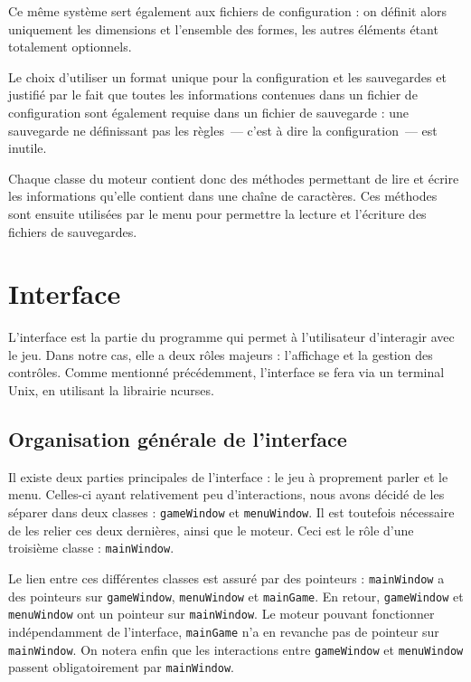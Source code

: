 \documentclass[11pt,a4paper]{article}
\begin{document}
Ce même système sert également aux fichiers de configuration : on définit alors uniquement les dimensions et l'ensemble des formes, les autres éléments étant totalement optionnels.

Le choix d'utiliser un format unique pour la configuration et les sauvegardes et justifié par le fait que toutes les informations contenues dans un fichier de configuration sont également requise dans un fichier de sauvegarde : une sauvegarde ne définissant pas les règles~--- c'est à dire la configuration~--- est inutile.

Chaque classe du moteur contient donc des méthodes permettant de lire et écrire les informations qu'elle contient dans une chaîne de caractères. Ces méthodes sont ensuite utilisées par le menu pour permettre la lecture et l'écriture des fichiers de sauvegardes.


\section{Interface}
L'interface est la partie du programme qui permet à l'utilisateur d'interagir avec le jeu. Dans notre cas, elle a deux rôles majeurs : l'affichage et la gestion des contrôles. Comme mentionné précédemment, l'interface se fera via un terminal Unix, en utilisant la librairie ncurses.

\subsection{Organisation générale de l'interface}
Il existe deux parties principales de l'interface : le jeu à proprement parler et le menu. Celles-ci ayant relativement peu d'interactions, nous avons décidé de les séparer dans deux classes : \verb"gameWindow" et \verb"menuWindow". Il est toutefois nécessaire de les relier ces deux dernières, ainsi que le moteur. Ceci est le rôle d'une troisième classe : \verb"mainWindow".

Le lien entre ces différentes classes est assuré par des pointeurs : \verb"mainWindow" a des pointeurs sur \verb"gameWindow", \verb"menuWindow" et \verb"mainGame". En retour, \verb"gameWindow" et \verb"menuWindow" ont un pointeur sur \verb"mainWindow". Le moteur pouvant fonctionner indépendamment de l'interface, \verb"mainGame" n'a en revanche pas de pointeur sur \verb"mainWindow". On notera enfin que les interactions entre \verb"gameWindow" et \verb"menuWindow" passent obligatoirement par \verb"mainWindow".
\end{document}
